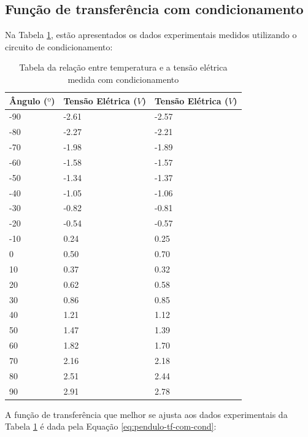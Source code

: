 \documentclass[a4paper]{instrumentacao}
\begin{document}
\subsection{Função de transferência com condicionamento}

Na Tabela \ref{tab:pendulo-calibracao-condicionado}, estão apresentados os dados experimentais medidos utilizando o circuito de condicionamento:

\begin{table}[H]
\centering
\caption{Tabela da relação entre temperatura e a tensão elétrica medida com condicionamento}
\begin{tabular}{|l|l|l|}
 \hline
 \textbf{Ângulo ($º$)} & \textbf{Tensão Elétrica ($V$)} & \textbf{Tensão Elétrica ($V$)} \\ \hline

 -90 & -2.61 & -2.57 	\\ \hline
 -80 & -2.27 & -2.21 	\\ \hline
 -70 & -1.98 & -1.89 	\\ \hline
 -60 & -1.58 & -1.57 	\\ \hline
 -50 & -1.34 & -1.37 	\\ \hline
 -40 & -1.05 & -1.06 	\\ \hline
 -30 & -0.82 & -0.81 	\\ \hline
 -20 & -0.54 & -0.57 	\\ \hline
 -10 & 0.24 & 0.25 		\\ \hline
 0 & 0.50 & 0.70 		\\ \hline
 10 & 0.37 & 0.32 		\\ \hline
 20 & 0.62 & 0.58 		\\ \hline
 30 & 0.86 & 0.85 		\\ \hline
 40 & 1.21 & 1.12 		\\ \hline
 50 & 1.47 & 1.39 		\\ \hline
 60 & 1.82 & 1.70 		\\ \hline
 70 & 2.16 & 2.18 		\\ \hline
 80 & 2.51 & 2.44 		\\ \hline
 90 & 2.91 & 2.78 		\\ \hline

\end{tabular}
\label{tab:pendulo-calibracao-condicionado}
\end{table}

A função de transferência que melhor se ajusta aos dados experimentais da Tabela \ref{tab:pendulo-calibracao-condicionado} é dada pela Equação \ref{eq:pendulo-tf-com-cond}:
\end{document}
